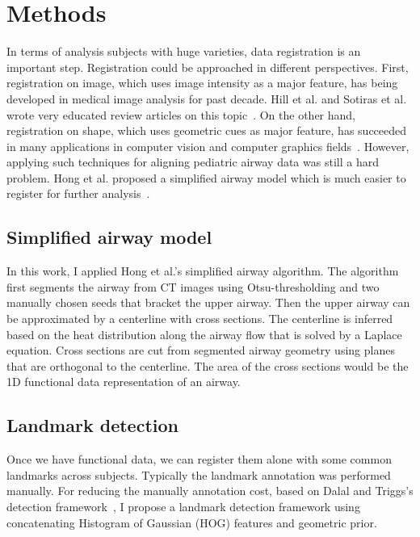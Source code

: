 \section{Methods}
\label{sec:methods}
In terms of analysis subjects with huge varieties, data registration is an important step.
Registration could be approached in different perspectives.
First, registration on image, which uses image intensity as a major feature, has being developed in medical image analysis for past decade. 
Hill et al. and Sotiras et al. wrote very educated review articles on this topic~\cite{hill2001medical,otiras2013deformable}.
On the other hand, registration on shape, which uses geometric cues as major feature, has succeeded in many applications in computer vision and computer graphics fields~\cite{belongie2002shape,li2012temporally}.
However, applying such techniques for aligning pediatric airway data was still a hard problem.
Hong et al. proposed a simplified airway model which is much easier to register for further analysis~\cite{hong2014statistical}.

\subsection{Simplified airway model}
\label{sec:simplified_airway_model}
In this work, I applied Hong et al.'s simplified airway algorithm.
The algorithm first segments the airway from CT images using Otsu-thresholding and two manually chosen seeds that bracket the upper airway.
Then the upper airway can be approximated by a centerline with cross sections.
The centerline is inferred based on the heat distribution along the airway flow that is solved by a Laplace equation.
Cross sections are cut from segmented airway geometry using planes that are orthogonal to the centerline. 
The area of the cross sections would be the 1D functional data representation of an airway.

\subsection{Landmark detection}
\label{sec:landmark_detection}
Once we have functional data, we can register them alone with some common landmarks across subjects.
Typically the landmark annotation was performed manually.
For reducing the manually annotation cost, based on Dalal and Triggs's  detection framework~\cite{dalal2005histograms}, I propose a landmark detection framework using concatenating Histogram of Gaussian (HOG) features and geometric prior.

